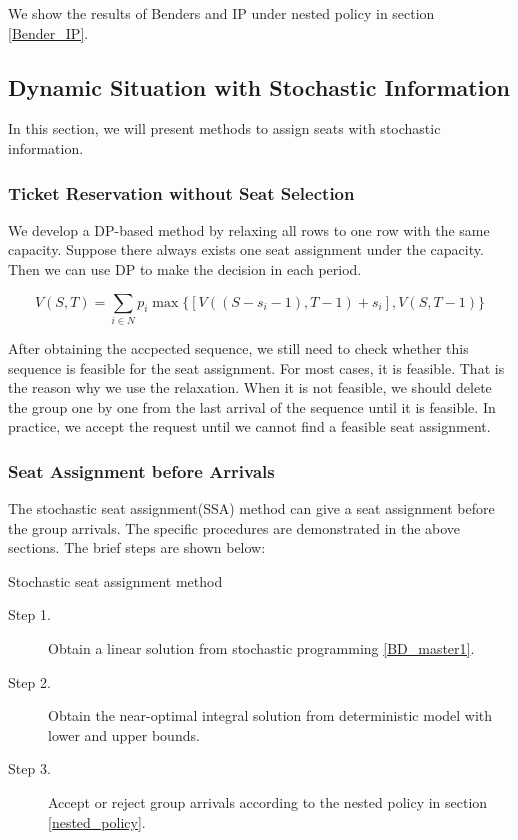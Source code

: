 We show the results of Benders and IP under nested policy in section \ref{Bender_IP}.

\subsection{Dynamic Situation with Stochastic Information}
In this section, we will present methods to assign seats with stochastic information.


\subsubsection{Ticket Reservation without Seat Selection}
We develop a DP-based method by relaxing all rows to one row with the same capacity.
Suppose there always exists one seat assignment under the capacity. Then we can use DP to make the decision in each period.

$$V(S,T) = \sum_{i \in N} p_i \max\{ {[V((S-s_i-1),T-1)+ s_i]}, {V(S,T-1)}\}$$

After obtaining the accpected sequence, we still need to check whether this sequence is feasible for the seat assignment. For most cases, it is feasible. That is the reason why we use the relaxation. When it is not feasible, we should delete the group one by one from the last arrival of the sequence until it is feasible. In practice, we accept the request until we cannot find a feasible seat assignment.


\subsubsection{Seat Assignment before Arrivals}
The stochastic seat assignment(SSA) method can give a seat assignment before the group arrivals. The specific procedures are demonstrated in the above sections. The brief steps are shown below: 

\begin{algorithm}[H]\label{general_method}
  \caption{Stochastic seat assignment method}
  \begin{description}
    \item[Step 1.] Obtain a linear solution from stochastic programming \eqref{BD_master1}.
    \item[Step 2.] Obtain the near-optimal integral solution from deterministic model with lower and upper bounds.
    \item[Step 3.] Accept or reject group arrivals according to the nested policy in section \ref{nested_policy}.

  \end{description}
\end{algorithm}

